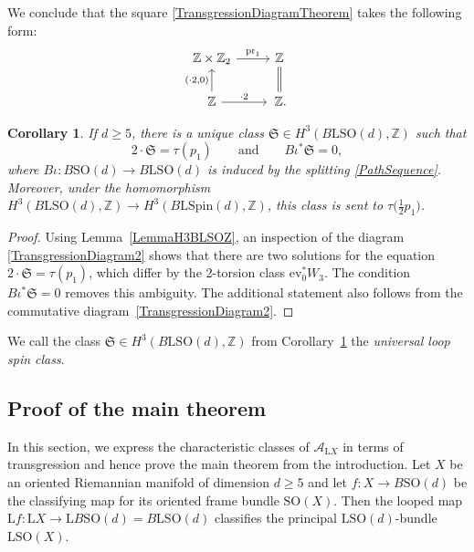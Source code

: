\documentclass[11pt]{article}
\numberwithin{equation}{section}
\numberwithin{equation}{section}
\newtheorem{Corollary}[Theorem]{Corollary}
\newcommand{\Z}{\mathbb{Z}}
\newcommand{\A}{\mathcal{A}}
\newcommand{\SO}{\mathrm{SO}}
\newcommand{\Spin}{\mathrm{Spin}}
\renewcommand{\L}{\mathrm{L}}
\begin{document}
We conclude that the square \eqref{TransgressionDiagramTheorem} takes the following form:
\begin{equation}\label{TransgressionDiagram2}
\begin{tikzcd}
 \Z \times \Z_2 \ar[r, "\mathrm{pr}_1"] & \Z \ar[d, equal] \\
 \Z \ar[u, "(\cdot 2\text{,} 0)"] \ar[r, "\cdot 2"] &\, \Z.
\end{tikzcd}
\end{equation}


\begin{Corollary} \label{CorollaryStringClass}
If $d \geq 5$, there is a unique class $\mathfrak{S} \in H^3(B\L\SO(d), \Z)$ such that
\begin{equation*}
2 \cdot \mathfrak{S} = \tau(p_1) \qquad \text{and} \qquad B\iota^*\mathfrak{S} = 0,
\end{equation*}
where $B\iota\colon B\SO(d) \to B\L\SO(d)$ is induced by the splitting \eqref{PathSequence}.
Moreover, under the homomorphism $H^3(B\L\SO(d), \Z) \to H^3(B\L\Spin(d), \Z)$, this class is sent to $\tau\big(\frac{1}{2}p_1\big)$.
\end{Corollary}

\begin{proof}
Using Lemma~\ref{LemmaH3BLSOZ}, an inspection of the diagram \eqref{TransgressionDiagram2} shows that there are two solutions for the equation $2 \cdot \mathfrak{S} = \tau(p_1)$, which differ by the 2-torsion class $\mathrm{ev}_0^*W_3$.
The condition $B\iota^*\mathfrak{S} = 0$ removes this ambiguity.
The additional statement also follows from the commutative diagram~\eqref{TransgressionDiagram2}.
\end{proof}

\begin{Definition} \label{DefinitionStringClass}
We call the class $\mathfrak{S} \in H^3(B\L\SO(d), \Z)$ from Corollary~\ref{CorollaryStringClass} the \emph{universal loop spin class}.
\end{Definition}

\subsection{Proof of the main theorem}

In this section, we express the characteristic classes of $\A_{\L X}$ in terms of transgression and hence prove the main theorem from the introduction.
Let $X$ be an oriented Riemannian manifold of dimension $d\geq5$ and let $f\colon X \to B\SO(d)$ be the classifying map for its oriented frame bundle $\SO(X)$.
Then the looped map $\L f\colon \L X \to \L B\SO(d) = B\L\SO(d)$ classifies the principal $\L\SO(d)$-bundle $\L\SO(X)$.
\end{document}

